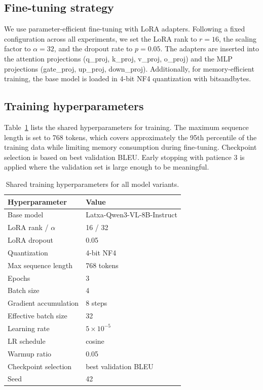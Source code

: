 \documentclass[11pt,a4paper]{article}
\begin{document}
\subsection{Fine-tuning strategy}

We use parameter-efficient fine-tuning with LoRA adapters. Following a
fixed configuration across all experiments, we set the LoRA rank to
$r=16$, the scaling factor to $\alpha=32$, and the dropout rate to
$p=0.05$. The adapters are inserted into the attention projections
(q\_proj, k\_proj, v\_proj, o\_proj) and the MLP projections
(gate\_proj, up\_proj, down\_proj). Additionally, for memory-efficient training, the base model is loaded in 4-bit NF4
quantization with bitsandbytes.

\subsection{Training hyperparameters}

Table~\ref{tab:hyperparams} lists the shared hyperparameters for training. The maximum sequence length is set to 768 tokens,
which covers approximately the 95th percentile of the training data
while limiting memory consumption during fine-tuning.
Checkpoint selection is based on best validation BLEU. Early stopping
with patience 3 is applied where the validation set is large enough
to be meaningful.

\begin{table}[H]
\small
\centering
\begin{tabular}{ll}
\toprule
\textbf{Hyperparameter} & \textbf{Value} \\
\midrule
Base model & Latxa-Qwen3-VL-8B-Instruct \\
LoRA rank / $\alpha$ & 16 / 32 \\
LoRA dropout & 0.05 \\
Quantization & 4-bit NF4 \\
Max sequence length & 768 tokens \\
Epochs & 3 \\
Batch size & 4 \\
Gradient accumulation & 8 steps \\
Effective batch size & 32 \\
Learning rate & $5 \times 10^{-5}$ \\
LR schedule & cosine \\
Warmup ratio & 0.05 \\
Checkpoint selection & best validation BLEU \\
Seed & 42 \\
\bottomrule
\end{tabular}
\caption{Shared training hyperparameters for all model variants.}
\label{tab:hyperparams}
\end{table}
\end{document}
